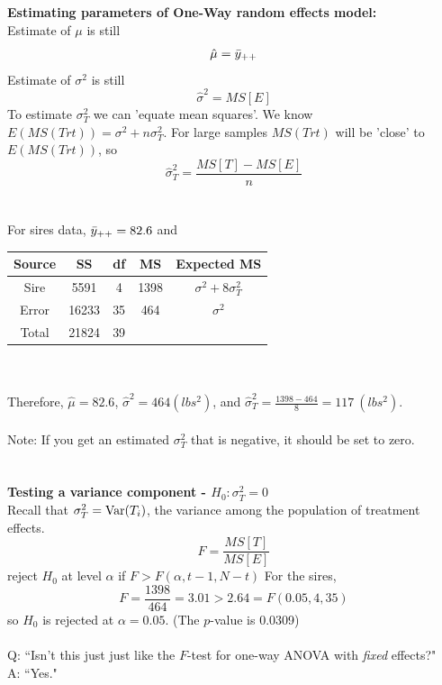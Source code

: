 \newpage

\textbf{Estimating parameters of One-Way random effects model:}\\
Estimate of $\mu$ is still
$$\hat\mu = \bar{y}_{++}$$
Estimate of $\sigma^2$ is still
$$\hat\sigma^2 = MS[E] $$
To estimate $\sigma^2_T$ we can 'equate mean squares'.  We know $E(MS(Trt))=\sigma^2+n\sigma^2_T$.  For large samples $MS(Trt)$ will be 'close' to $E(MS(Trt))$, so
$$\hat\sigma_T^2 = \frac{MS[T]-MS[E]}{n}$$
~\\~\\
For sires data, $\bar{y}_{++}=82.6$ and 
\begin{center}
\begin{tabular}{ccccc}
Source & SS & df & MS & Expected MS \\ \hline
Sire & 5591 & 4 & 1398 & $\sigma^2 + 8 \sigma_T^2$ \\
Error & 16233 &35 & 464 & $\sigma^2$  \\
Total & 21824 & 39 & &  \\ \hline
\end{tabular}
\end{center}
~\\~\\
Therefore, $\hat\mu = 82.6$, $\hat\sigma^2 = 464 (lbs^2)$, and $\hat\sigma_T^2 = \frac{1398-464}{8} = 117 \ (lbs^2)$.\\~\\
Note: If you get an estimated $\sigma^2_T$ that is negative, it should be set to zero.\\~\\~\\
\textbf{Testing a variance component - $H_0: \sigma_T^2=0$}\\
Recall that $\sigma_T^2 = \mbox{Var}(T_i) $, the variance among the population of treatment effects.
$$ F=\frac{MS[T]}{MS[E]} $$
reject $H_0$ at level $\alpha$ if $F > F(\alpha,t-1,N-t)$
For the sires, 
$$ F=\frac{1398}{464} = 3.01 > 2.64 = F(0.05,4,35) $$ 
so $H_0$ is rejected at $\alpha=0.05$.  (The $p$-value is 0.0309)\\~\\
Q: ``Isn't this just just like the $F$-test for one-way ANOVA with {\em fixed} effects?"\\
A: ``Yes."

\newpage

